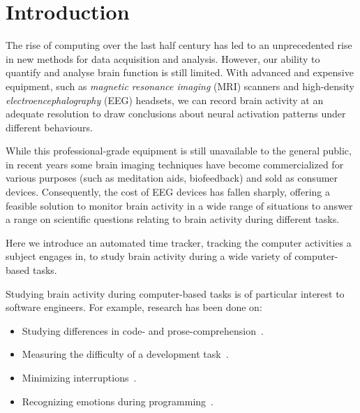 \chapter{Introduction}




The rise of computing over the last half century has led to an unprecedented rise in new methods for data acquisition and analysis. However, our ability to quantify and analyse brain function is still limited. With advanced and expensive equipment, such as \emph{magnetic resonance imaging} (MRI) scanners and high-density \emph{electroencephalography} (EEG) headsets, we can record brain activity at an adequate resolution to draw conclusions about neural activation patterns under different behaviours.

While this professional-grade equipment is still unavailable to the general public, in recent years some brain imaging techniques have become commercialized for various purposes (such as meditation aids, biofeedback) and sold as consumer devices. Consequently, the cost of EEG devices has fallen sharply, offering a feasible solution to monitor brain activity in a wide range of situations to answer a range on scientific questions relating to brain activity during different tasks.


Here we introduce an automated time tracker, tracking the computer activities a subject engages in, to study brain activity during a wide variety of computer-based tasks.

Studying brain activity during computer-based tasks is of particular interest to software engineers. For example, research has been done on:

\begin{itemize}
    \item Studying differences in code- and prose-comprehension~\cite{floyd_decoding_2017}\cite{fucci_replication_2019}.
    \item Measuring the difficulty of a development task~\cite{fritz_using_2014}.
    \item Minimizing interruptions~\cite{zuger_reducing_2017}.
    \item Recognizing emotions during programming~\cite{girardi_recognizing_2020}.
\end{itemize}

